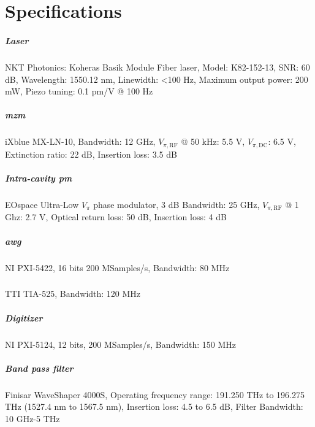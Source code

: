 \chapter{Specifications}

\label{app-data}

\paragraph{Laser} NKT Photonics: Koheras Basik Module Fiber laser, Model: K82-152-13, SNR: 60 dB, Wavelength: 1550.12 nm, Linewidth: <100 Hz, Maximum output power: 200 mW, Piezo tuning: 0.1 pm/V @ 100 Hz \cite{laser}

\paragraph{\acrlong{mzm}} iXblue MX-LN-10,
Bandwidth: 12 GHz, $V_{\pi,\text{RF}}$ @ 50 kHz: 5.5 V, $V_{\pi,\text{DC}}$: 6.5 V, Extinction ratio: 22 dB, Insertion loss: 3.5 dB \cite{mzm}

\paragraph{Intra-cavity \acrlong{pm}} EOspace Ultra-Low $V_\pi$ phase modulator, 3 dB Bandwidth: 25 GHz, $V_{\pi,\text{RF}}$ @ 1 Ghz: 2.7 V, Optical return loss: 50 dB, Insertion loss: 4 dB \cite{AkroutAkram2016Pprc}

\paragraph{\acrlong{awg}} NI PXI-5422, 16 bits 200 MSamples/s, Bandwidth: 80 MHz \cite{ni-pxi}

\paragraph{} TTI TIA-525, Bandwidth: 120 MHz \cite{pd}

\paragraph{Digitizer} NI PXI-5124, 12 bits, 200 MSamples/s, Bandwidth: 150 MHz \cite{ni-digitizer}

\paragraph{Band pass filter} Finisar WaveShaper 4000S, Operating frequency range: 191.250 THz to 196.275 THz (1527.4 nm to 1567.5 nm), Insertion loss: 4.5 to 6.5 dB, Filter Bandwidth: 10 GHz-5 THz \cite{wave-shaper}

